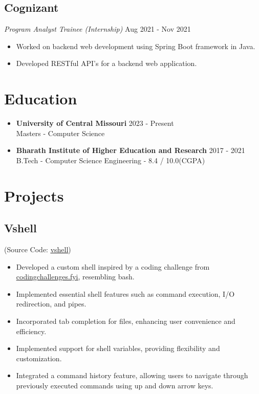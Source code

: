 \documentclass[10pt,a5paper]{article}
\begin{document}
\subsection{Cognizant}
\hspace*{0.25em}\textit{Program Analyst Trainee (Internship)}
\hfill Aug 2021 - Nov 2021
\begin{itemize}[leftmargin=6mm]
	\setlength\itemsep{0em}
	\item{Worked on backend web development using Spring Boot framework in Java.}
	\item{Developed RESTful API's for a backend web application.}
\end{itemize}

\section{Education}
\begin{itemize}[leftmargin=3mm]
	\setlength\itemsep{0em}
\item{
	\textbf{University of Central Missouri}
	\hfill 2023 {-} Present \\
	Masters {-} Computer Science
}
\item {
	\textbf{Bharath Institute of Higher Education and Research}
	\hfill 2017 {-} 2021 \\
	B.Tech {-} Computer Science Engineering {-} 8.4 / 10.0(CGPA)
}
\end{itemize}

\section{Projects}
\subsection{Vshell}
\hfill (Source Code: \href{https://github.com/v1n0dh/vshell}{\underline {vshell}})
\begin{itemize}[leftmargin=6mm]
	\setlength\itemsep{0em}
	\item{Developed a custom shell inspired by a coding challenge from \href{https://codingchallenges.fyi/challenges/challenge-shell}{\underline {codingchallenges.fyi}}, resembling bash.}
	\item{Implemented essential shell features such as command execution, I/O redirection, and pipes.
}
	\item{Incorporated tab completion for files, enhancing user convenience and efficiency.}
	\item{Implemented support for shell variables, providing flexibility and customization.}
	\item{Integrated a command history feature, allowing users to navigate through previously executed commands using up and down arrow keys.}
\end{itemize}
\vspace*{-0.5em}
\end{document}
